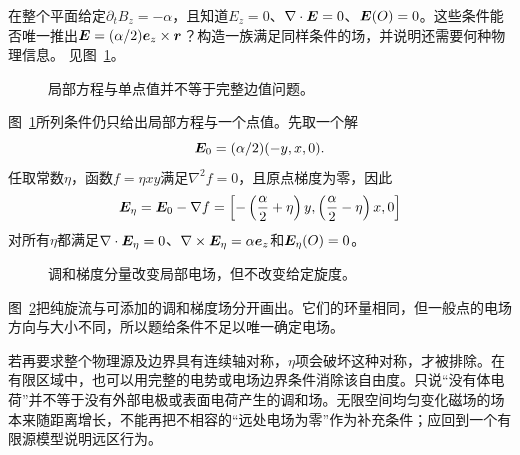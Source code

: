 \begin{exercise}[旋度、散度与中心值是否足够]\label{ex:i1-h14}
在整个平面给定$\partial_tB_z=-\alpha$，且知道$E_z=0$、$\nabla\cdot\bm{E}=0$、$\bm{E}(O)=0$。这些条件能否唯一推出$\bm{E}=(\alpha/2)\bm{e}_z\times\bm{r}$？构造一族满足同样条件的场，并说明还需要何种物理信息。 见图~\ref{fig:i1-h14-q}。
\end{exercise}

\begin{figure}[H]\centering
{}
\caption{局部方程与单点值并不等于完整边值问题。}\label{fig:i1-h14-q}
\end{figure}
\begin{solution}
图~\ref{fig:i1-h14-q}所列条件仍只给出局部方程与一个点值。先取一个解
\[\bm{E}_0=(\alpha/2)(-y,x,0).\]
任取常数$\eta$，函数$f=\eta xy$满足$\nabla^2f=0$，且原点梯度为零，因此
\[\bm{E}_\eta=\bm{E}_0-\nabla f
=\left[-\left(\frac\alpha2+\eta\right)y,
\left(\frac\alpha2-\eta\right)x,0\right]
\]
对所有$\eta$都满足$\nabla\cdot\bm{E}_\eta=0$、$\nabla\times\bm{E}_\eta=\alpha\bm{e}_z$和$\bm{E}_\eta(O)=0$。


\begin{figure}[H]\centering
{}
\caption{调和梯度分量改变局部电场，但不改变给定旋度。}\label{fig:i1-h14-s}
\end{figure}

图~\ref{fig:i1-h14-s}把纯旋流与可添加的调和梯度场分开画出。它们的环量相同，但一般点的电场方向与大小不同，所以题给条件不足以唯一确定电场。

若再要求整个物理源及边界具有连续轴对称，$\eta$项会破坏这种对称，才被排除。在有限区域中，也可以用完整的电势或电场边界条件消除该自由度。只说“没有体电荷”并不等于没有外部电极或表面电荷产生的调和场。无限空间均匀变化磁场的场本来随距离增长，不能再把不相容的“远处电场为零”作为补充条件；应回到一个有限源模型说明远区行为。
\end{solution}
